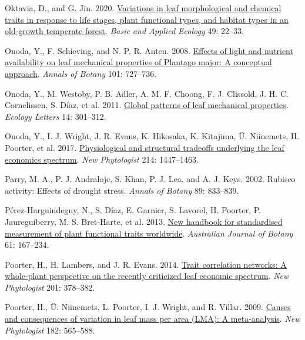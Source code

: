 \documentclass[
  12pt,
  a4paper,
,tablecaptionabove
]{scrartcl}
\newlength{\cslhangindent}
\newenvironment{CSLReferences}[2] %
 {%
  \setlength{\parindent}{0pt}
  \ifodd #1 \everypar{\setlength{\hangindent}{\cslhangindent}}\ignorespaces\fi
  \ifnum #2 > 0
  \setlength{\parskip}{#2\baselineskip}
  \fi
 }%
 {}
\begin{document}
\begin{CSLReferences}{1}{0}
\leavevmode{}%
Oktavia, D., and G. Jin. 2020. \href{https://doi.org/10.1016/j.baae.2020.09.010}{Variations in leaf morphological and chemical traits in response to life stages, plant functional types, and habitat types in an old-growth temperate forest}. \emph{Basic and Applied Ecology} 49: 22--33.

\leavevmode{}%
Onoda, Y., F. Schieving, and N. P. R. Anten. 2008. \href{https://doi.org/10.1093/aob/mcn013}{Effects of light and nutrient availability on leaf mechanical properties of {Plantago} major: {A} conceptual approach}. \emph{Annals of Botany} 101: 727--736.

\leavevmode{}%
Onoda, Y., M. Westoby, P. B. Adler, A. M. F. Choong, F. J. Clissold, J. H. C. Cornelissen, S. Díaz, et al. 2011. \href{https://doi.org/10.1111/j.1461-0248.2010.01582.x}{Global patterns of leaf mechanical properties}. \emph{Ecology Letters} 14: 301--312.

\leavevmode{}%
Onoda, Y., I. J. Wright, J. R. Evans, K. Hikosaka, K. Kitajima, Ü. Niinemets, H. Poorter, et al. 2017. \href{https://doi.org/10.1111/nph.14496}{Physiological and structural tradeoffs underlying the leaf economics spectrum}. \emph{New Phytologist} 214: 1447--1463.

\leavevmode{}%
Parry, M. A., P. J. Andralojc, S. Khan, P. J. Lea, and A. J. Keys. 2002. Rubisco activity: Effects of drought stress. \emph{Annals of Botany} 89: 833--839.

\leavevmode{}%
Pérez-Harguindeguy, N., S. Díaz, E. Garnier, S. Lavorel, H. Poorter, P. Jaureguiberry, M. S. Bret-Harte, et al. 2013. \href{https://doi.org/10.1071/BT12225}{New handbook for standardised measurement of plant functional traits worldwide}. \emph{Australian Journal of Botany} 61: 167--234.

\leavevmode{}%
Poorter, H., H. Lambers, and J. R. Evans. 2014. \href{https://doi.org/10.1111/nph.12547}{Trait correlation networks: {A} whole-plant perspective on the recently criticized leaf economic spectrum}. \emph{New Phytologist} 201: 378--382.

\leavevmode{}%
Poorter, H., Ü. Niinemets, L. Poorter, I. J. Wright, and R. Villar. 2009. \href{https://doi.org/10.1111/j.1469-8137.2009.02830.x}{Causes and consequences of variation in leaf mass per area ({LMA}): {A} meta-analysis}. \emph{New Phytologist} 182: 565--588.


\end{CSLReferences}
\end{document}
